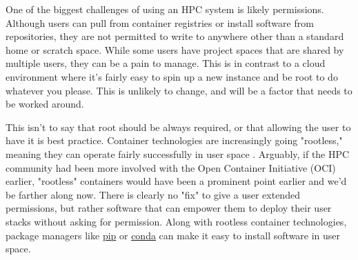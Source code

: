 One of the biggest challenges of using an HPC system is likely permissions. Although users can pull from container registries or install software from repositories, they are not permitted to write to anywhere other than a standard home or scratch space. While some users have project spaces that are shared by multiple users, they can be a pain to manage. This is in contrast to a cloud environment where it's fairly easy to spin up a new instance and be root to do whatever you please. This is unlikely to change, and will be a factor that needs to be worked around.

This isn't to say that root should be always required, or that allowing the user to have it is best practice. Container technologies are increasingly going "rootless," meaning they can operate fairly successfully in user space \cite{charlie,podman,Priedhorsky2021-xx}. Arguably, if the HPC community had been more involved with the Open Container Initiative (OCI) earlier, "rootless" containers would have been a prominent point earlier and we'd be farther along now. There is clearly no "fix" to give a user extended permissions, but rather software that can empower them to deploy their user stacks without asking for permission. Along with rootless container technologies, package managers like \href{https://pypi.org/project/pip/}{pip} or \href{https://docs.conda.io/en/latest/}{conda} can make it easy to install software in user space. 
